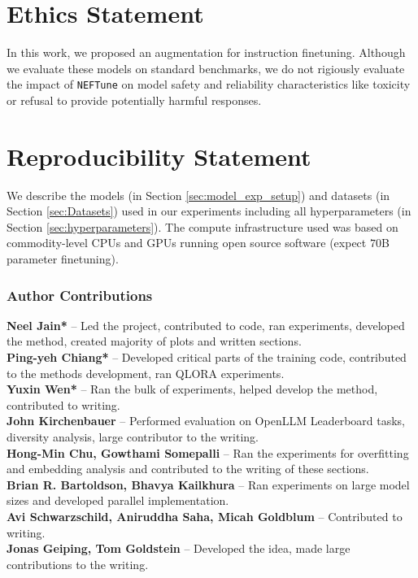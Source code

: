 \documentclass{article} %
\newcommand{\neftune}{\texttt{NEFTune}}
\begin{document}
\clearpage
\section{Ethics Statement}
In this work, we proposed an augmentation for instruction finetuning. Although we evaluate these models on standard benchmarks, we do not rigiously evaluate the impact of \neftune{} on model safety and reliability characteristics like toxicity or refusal to provide potentially harmful responses.

\section{Reproducibility Statement}
 We describe the models (in Section \ref{sec:model_exp_setup}) and datasets (in Section \ref{sec:Datasets}) used in our experiments including all hyperparameters (in Section \ref{sec:hyperparameters}).
The compute infrastructure used was based on commodity-level CPUs and GPUs running open source software (expect $70$B parameter finetuning).


\subsubsection*{Author Contributions}
\textbf{Neel Jain*} -- Led the project, contributed to code, ran experiments, developed the method, created majority of plots and written sections. \\
\textbf{Ping-yeh Chiang*} -- Developed critical parts of the training code, contributed to the methods development, ran QLORA experiments. \\
\textbf{Yuxin Wen*} -- Ran the bulk of experiments, helped develop the method, contributed to writing. \\
\textbf{John Kirchenbauer} --  Performed evaluation on OpenLLM Leaderboard tasks, diversity analysis, large contributor to the writing.   \\
\textbf{Hong-Min Chu, Gowthami Somepalli} -- Ran the experiments for overfitting and embedding analysis and contributed to the writing of these sections. \\
\textbf{Brian R. Bartoldson, Bhavya Kailkhura} -- Ran experiments on large model sizes and developed parallel implementation. \\
\textbf{Avi Schwarzschild, Aniruddha Saha, Micah Goldblum} -- Contributed to writing. \\
\textbf{Jonas Geiping, Tom Goldstein} -- Developed the idea, made large contributions to the writing.
\end{document}
